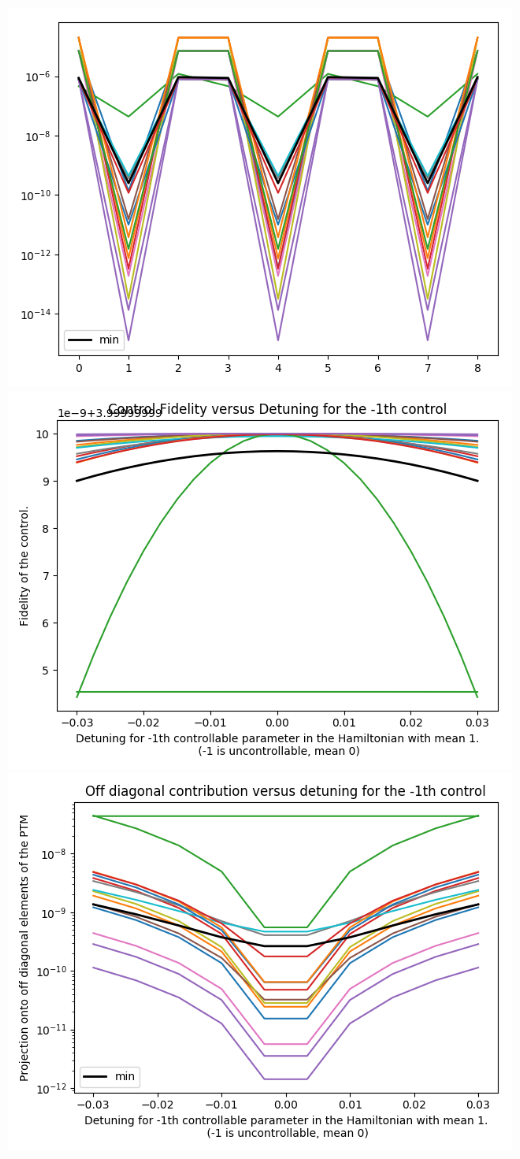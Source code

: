 \documentclass{article}
\begin{document}
\begin{center}
\includegraphics[scale=.9]{report_pickled_controls0/control_dpn_all}
\includegraphics[scale=.9]{control_fid_0}
\includegraphics[scale=.9]{off_diag_0}

\end{center}
\end{document}
